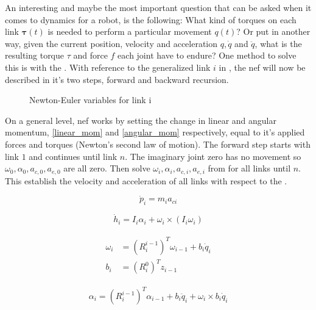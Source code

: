 An interesting and maybe the most important question that can be asked when it comes to dynamics for a robot, is the following: What kind of torques on each link $\mathbf{\tau}(t)$ is needed to perform a particular movement $q(t)$? Or put in another way, given the current position, velocity and acceleration $q, \dot{q}$ and $\ddot{q}$, what is the resulting torque $\tau$ and force $f$ each joint have to endure? One method to solve this is with the . With reference to the generalized link $i$ in , the  \gls{nef} will now be described in it's two steps, forward and backward recursion.

\begin{figure}[h!]    
    \centering           
    \def\svgwidth{\columnwidth}
    
    \caption{Newton-Euler variables for link i}
    \label{newtonEuler}
\end{figure}

On a general level, \gls{nef} works by setting the change in linear and angular momentum, \eqref{linear_mom} and \eqref{angular_mom} respectively, equal to it's applied forces and torques (Newton's second law of motion). The forward step starts with link $1$ and continues until link $n$. The imaginary joint zero has no movement so $\omega_0, \alpha_0, a_{c,0}, a_{e,0}$ are all zero. Then solve $\omega_i, \alpha_i, a_{c,i}, a_{e,i}$ from  for all links until $n$. This establish the velocity and acceleration of all links with respect to the .

\begin{equation}\label{linear_mom}
\dot{p}_i = m_i a_{ci}
\end{equation}

\begin{equation}\label{angular_mom}
\dot{h}_i = I_i \alpha_i + \omega_i \times \left ( I_i \omega_i \right )
\end{equation}

\begin{align}\label{omega}
\begin{split}
\omega_i &= \left ( R^{i-1}_i \right )^T\omega_{i-1} + b_i\dot{q}_i\\
b_i &= \left ( R^0_i \right )^T z_{i-1}
\end{split}
\end{align}

\begin{equation}\label{alpha}
\alpha_i = \left ( R^{i-1}_i \right )^T\alpha_{i-1} + b_i\ddot{q}_i+\omega_i \times b_i\dot{q}_i
\end{equation}

